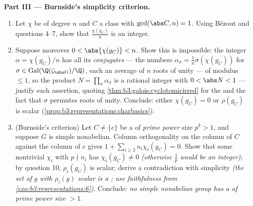 \begin{problem}
\medskip
\noindent\textbf{Part III --- Burnside's simplicity criterion.}
\begin{enumerate}[resume]
  \item Let $\chi$ be  of degree $n$ and $C$ a class
        with $\gcd(\abs C, n) = 1$. Using B\'ezout and questions
        4--7, show that $\frac{\chi(g_C)}{n}$ is an 
        integer.
  \item Suppose moreover $0 < \abs{\chi(g_C)} < n$. Show this is
        impossible: the  integer $\alpha =
        \chi(g_C)/n$ has all its \emph{conjugates} --- the
        numbers $\alpha_\sigma = \frac1n\sigma(\chi(g_C))$ for
        $\sigma \in \operatorname{Gal}(\Q(\zeta_{\abs G})/\Q)$,
        each an average of $n$ roots of unity --- of modulus
        $\leq 1$,
        so the product $N = \prod_\sigma\alpha_\sigma$ is a
        rational  integer with $0 < \abs N < 1$ ---
        justify each assertion, quoting
        \cref{thm:b3:galois:cyclotomicirred} for the  and the fact that $\sigma$ permutes roots of
        unity. Conclude: either $\chi(g_C) = 0$ or $\rho(g_C)$
        is scalar (\cref{prop:b3:representations:charbasics}).
  \item (Burnside's criterion) Let $C \neq \{e\}$ be a
         of \emph{prime power} size $p^k > 1$,
        and suppose $G$ is simple nonabelian. Column
        orthogonality on the column of $C$ against the column of
        $e$ gives $1 + \sum_{i \geq 2} n_i\chi_i(g_C) = 0$. Show
        that some nontrivial $\chi_i$ with $p \nmid n_i$ has
        $\chi_i(g_C) \neq 0$ \emph{(otherwise $\frac1p$ would be
        an  integer)}; by question 10, $\rho_i(g_C)$
        is scalar; derive a contradiction with simplicity
        \emph{(the set of $g$ with $\rho_i(g)$ scalar is a
        ; use faithfulness from
        \cref{exo:b3:representations:6})}. Conclude: \emph{no
        simple nonabelian group has a  of prime
        power size $> 1$.}
\end{enumerate}


\end{problem}
